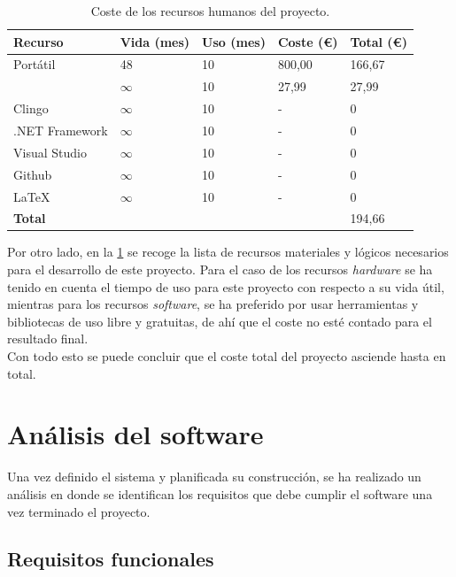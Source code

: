 \begin{table}[!h]
	\centering
	\begin{tabularx}{\textwidth}{ l X X X X }
		\bfseries{Recurso} & \bfseries{Vida (mes)} & \bfseries{Uso (mes)} & \bfseries{Coste (\euro)} & \bfseries{Total (\euro)} \\
		\hline
		Portátil & 48 & 10 & 800,00 & 166,67 \\
		\cities & $\infty$ & 10 & 27,99 & 27,99 \\
		Clingo & $\infty$ & 10 & - & 0 \\
		.NET Framework & $\infty$ & 10 & - & 0 \\
		Visual Studio & $\infty$ & 10 & - & 0 \\
		Github & $\infty$ & 10 & - & 0 \\
		LaTeX & $\infty$ & 10 & - & 0 \\
		\hline
		\bfseries{Total} & & & & 194,66 \\
		\hline
	\end{tabularx}
	\caption{Coste de los recursos humanos del proyecto.}\label{table:costematerial}
\end{table}

Por otro lado, en la \ref{table:costematerial} se recoge la lista de recursos materiales y lógicos necesarios para el desarrollo de este proyecto. Para el caso de los recursos \textit{hardware} se ha tenido en cuenta el tiempo de uso para este proyecto con respecto a su vida útil, mientras para los recursos \textit{software}, se ha preferido por usar herramientas y bibliotecas de uso libre y gratuitas, de ahí que el coste no esté contado para el resultado final. \\

Con todo esto se puede concluir que el coste total del proyecto asciende hasta  en total.

\section{Análisis del software}

Una vez definido el sistema y planificada su construcción, se ha realizado un análisis en donde se identifican los requisitos que debe cumplir el software una vez terminado el proyecto.

\subsection{Requisitos funcionales}
\label{subsec:funcrequirements}

